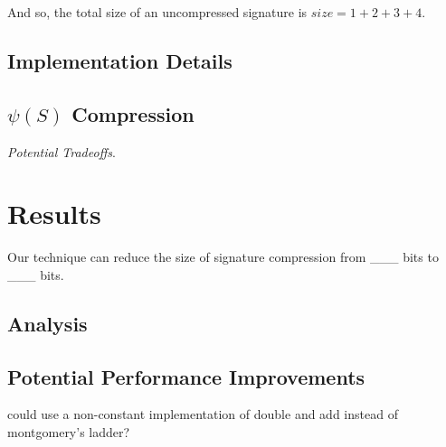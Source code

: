 And so, the total size of an uncompressed signature is $size = 1 + 2 + 3 + 4$.


\subsection{Implementation Details}

\subsection{$\psi(S)$ Compression}

\noindent
\textit{Potential Tradeoffs}.

\section{Results}

Our technique can reduce the size of \sidh signature compression from \_\_\_ bits to \_\_\_ bits.

\subsection{Analysis}

\subsection{Potential Performance Improvements}

could use a non-constant implementation of double and add instead of montgomery's ladder? 

